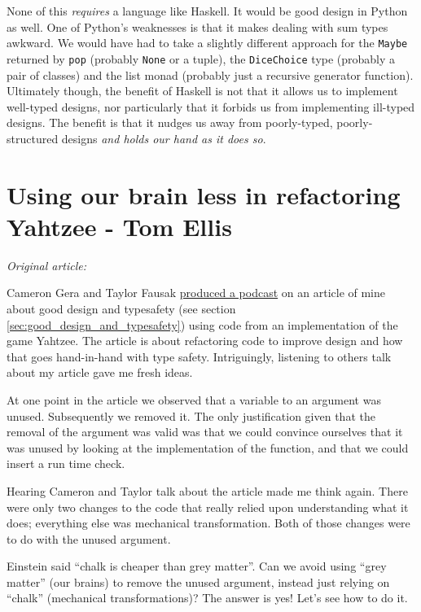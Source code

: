 None of this \textit{requires} a language like Haskell. It would be good design in Python as well. One of Python's weaknesses is that it makes dealing with sum types awkward. We would have had to take a slightly different approach for the \texttt{Maybe} returned by \texttt{pop} (probably \texttt{None} or a tuple), the \texttt{DiceChoice} type (probably a pair of classes) and the list monad (probably just a recursive generator function). Ultimately though, the benefit of Haskell is not that it allows us to implement well-typed designs, nor particularly that it forbids us from implementing ill-typed designs. The benefit is that it nudges us away from poorly-typed, poorly-structured designs \textit{and holds our hand as it does so}.








\chapter{Using our brain less in refactoring Yahtzee - Tom Ellis}

\textit{Original article: \cite{using_our_brain_less}}

\vspace{\baselineskip}

\noindent Cameron Gera and Taylor Fausak \href{https://haskellweekly.news/episode/22.html}{produced a podcast} on an article of mine about good design and typesafety (see section \ref{sec:good_design_and_typesafety}) using code from an implementation of the game Yahtzee. The article is about refactoring code to improve design and how that goes hand-in-hand with type safety. Intriguingly, listening to others talk about my article gave me fresh ideas.

At one point in the article we observed that a variable to an argument was unused. Subsequently we removed it. The only justification given that the removal of the argument was valid was that we could convince ourselves that it was unused by looking at the implementation of the function, and that we could insert a run time check.

Hearing Cameron and Taylor talk about the article made me think again. There were only two changes to the code that really relied upon understanding what it does; everything else was mechanical transformation. Both of those changes were to do with the unused argument.

Einstein said ``chalk is cheaper than grey matter''. Can we avoid using ``grey matter'' (our brains) to remove the unused argument, instead just relying on ``chalk'' (mechanical transformations)? The answer is yes! Let's see how to do it.


